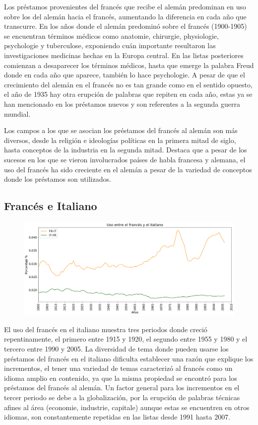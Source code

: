 Los préstamos provenientes del francés que recibe el alemán predominan en uso sobre los del alemán hacia el francés, aumentando la diferencia en cada año que transcurre.  En los años donde el alemán predominó sobre el francés (1900-1905) se encuentran términos médicos como anatomie, chirurgie, physiologie, psychologie y tuberculose, exponiendo cuán importante resultaron las investigaciones medicinas hechas en la Europa central.  En las listas posteriores comienzan a desaparecer los términos médicos, hasta que emerge la palabra Freud donde en cada año que aparece, también lo hace psychologie.  A pesar de que el crecimiento del alemán en el francés no es tan grande como en el sentido opuesto,  el año de 1935  hay otra erupción de palabras que repiten en cada año, estas ya se han mencionado en los préstamos nuevos y son referentes a la segunda guerra mundial. 

Los campos a los que se asocian los préstamos del francés al alemán son más diversos, desde la religión e ideologías políticas  en la primera mitad de siglo, hasta conceptos de la industria en la segunda mitad. Destaca que a pesar de los sucesos en los que se vieron involucrados países de habla francesa y alemana, el uso del francés ha sido creciente en el alemán  a pesar de la variedad de conceptos donde los préstamos son utilizados. 


\subsection{Francés e Italiano}

\begin{figure}[h!]
	\centering
	\includegraphics[scale=.38]{Cap_3/SF_3_S2_FR.png}
	\label{SF_FI}
	\caption{}
\end{figure}


El uso del francés en el italiano muestra tres periodos donde creció repentinamente, el primero entre 1915 y 1920, el segundo entre 1955 y 1980 y el tercero  entre 1990 y 2005.  La diversidad de tema donde pueden usarse los préstamos del francés en el italiano dificulta establecer una razón que explique los incrementos, el tener una variedad de temas caracterizó al francés como un idioma amplio  en contenido,  ya que la misma propiedad se encontró para los préstamos del francés al alemán.  Un factor general para los incrementos en el tercer periodo se debe a la globalización,  por la erupción de palabras  técnicas afines al área (economie, industrie,  capitale) aunque estas se encuentren en otros idiomas, son constantemente repetidas en las listas desde 1991 hasta 2007. 

